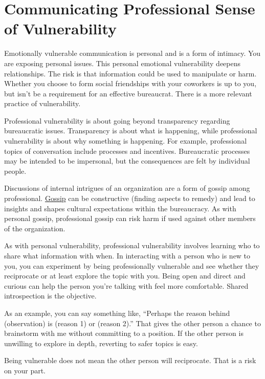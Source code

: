 \section{Communicating Professional Sense of Vulnerability\label{sec:professional-vulnerability}}

Emotionally vulnerable communication is personal and is a form of intimacy. You are exposing personal issues. This personal emotional vulnerability deepens relationships. The risk is that information could be used to manipulate or harm. Whether you choose to form social friendships with your coworkers is up to you, but isn't be a requirement for an effective bureaucrat. There is a more relevant practice of vulnerability.

Professional vulnerability is about going beyond transparency regarding bureaucratic issues. Transparency is about what is happening, while professional vulnerability is about why something is happening. For example, professional topics of conversation include processes and incentives. Bureaucratic processes may be intended to be impersonal, but the consequences are felt by individual people.


Discussions of internal intrigues of an organization are a form of gossip among professional. \href{https://en.wikipedia.org/wiki/Gossip}{Gossip} 
can be constructive (finding aspects to remedy) and lead to insights and shapes cultural expectations within the bureaucracy. As with personal gossip, professional gossip can risk harm if used against other members of the organization. 

As with personal vulnerability, professional vulnerability involves learning who to share what information with when. In interacting with a person who is new to you, you can experiment by being professionally vulnerable and see whether they reciprocate or at least explore the topic with you. Being open and direct and curious can help the person you're talking with feel more comfortable. Shared introspection is the objective. 

As an example, you can say something like, ``Perhaps the reason behind (observation) is (reason 1) or (reason 2).'' That gives the other person a chance to brainstorm with me without committing to a position. If the other person is unwilling to explore in depth, reverting to safer topics is easy.

Being vulnerable does not mean the other person will reciprocate. That is a risk on your part. 